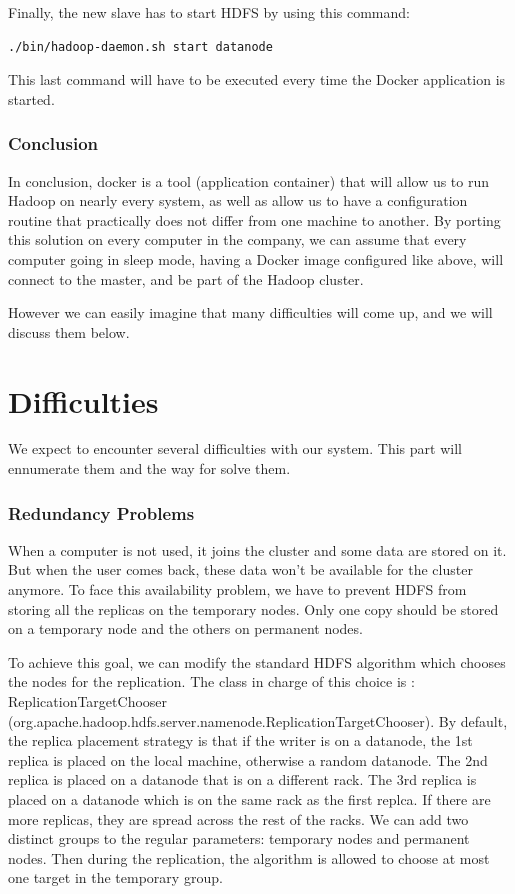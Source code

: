 \documentclass[11pt]{report} %
\begin{document}
Finally, the new slave has to start HDFS by using this command:
\begin{lstlisting}[language=bash]
./bin/hadoop-daemon.sh start datanode
\end{lstlisting}
This last command will have to be executed every time the Docker application is started.

\section{Conclusion}
In conclusion, docker is a tool (application container) that will allow us to run Hadoop on nearly every system, as well as allow us to have a configuration routine that practically does not differ from one machine to another. By porting this solution on every computer in the company, we can assume that every computer going in sleep mode, having a Docker image configured like above, will connect to the master, and be part of the Hadoop cluster.

However we can easily imagine that many difficulties will come up, and we will discuss them below.

\part{Difficulties}

We expect to encounter several difficulties with our system. This part will ennumerate them and the way for solve them.

\section{Redundancy Problems}
When a computer is not used, it joins the cluster and some data are stored on it. But when the user comes back, these data won't be available for the cluster anymore. To face this availability problem, we have to prevent HDFS from storing all the replicas on the temporary nodes. Only one copy should be stored on a temporary node and the others on permanent nodes.

To achieve this goal, we can modify the standard HDFS algorithm which chooses the nodes for the replication. The class in charge of this choice is : ReplicationTargetChooser (org.apache.hadoop.hdfs.server.namenode.ReplicationTargetChooser). By default, the replica placement strategy is that if the writer is on a datanode, the 1st replica is placed on the local machine, otherwise a random datanode. The 2nd replica is placed on a datanode that is on a different rack. The 3rd replica is placed on a datanode which is on the same rack as the first replca. If there are more replicas, they are spread across the rest of the racks.
We can add two distinct groups to the regular parameters: temporary nodes and permanent nodes. Then during the replication, the algorithm is allowed to choose at most one target in the temporary group.
\end{document}
